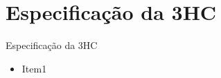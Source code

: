 \section{Especificação da 3HC}


\begin{frame}{Especificação da 3HC}

{\footnotesize
\begin{itemize}
    \setlength\itemsep{0.5em}
    \item Item1
\end{itemize}
}
\vspace{-0.2cm}
\end{frame}
